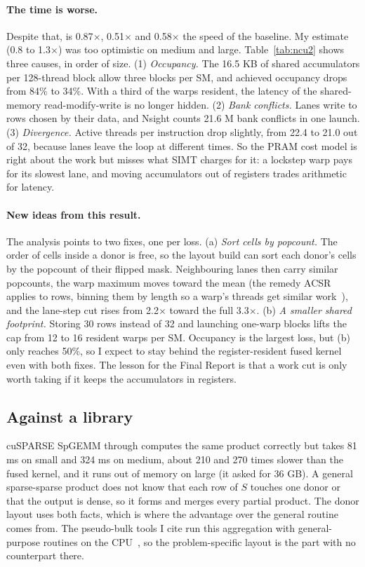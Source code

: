 \paragraph{The time is worse.} Despite that,  is 0.87$\times$, 0.51$\times$ and 0.58$\times$ the speed of the baseline. My estimate (0.8 to 1.3$\times$) was too optimistic on medium
and large. Table~\ref{tab:ncu2} shows three causes, in order of size.
(1) \emph{Occupancy.} The 16.5 KB of shared accumulators per 128-thread block allow three blocks per SM,
and achieved occupancy drops from 84\% to 34\%. With a third of the warps resident, the latency of the
shared-memory read-modify-write is no longer hidden. (2) \emph{Bank conflicts.} Lanes write to rows
chosen by their data, and Nsight counts 21.6 M bank conflicts in one launch. (3) \emph{Divergence.}
Active threads per instruction drop slightly, from 22.4 to 21.0 out of 32, because lanes leave the 
loop at different times. So the PRAM cost model is right about the work but misses what SIMT charges
for it: a lockstep warp pays for its slowest lane, and moving accumulators out of registers trades
arithmetic for latency.

\paragraph{New ideas from this result.} The analysis points to two fixes, one per loss. (a)
\emph{Sort cells by popcount.} The order of cells inside a donor is free, so the layout build can sort
each donor's cells by the popcount of their flipped mask. Neighbouring lanes then carry similar popcounts, the warp maximum moves toward the mean (the
remedy ACSR applies to rows, binning them by length so a warp's threads get similar
work~\cite{ashari2014}), and the lane-step cut rises from 2.2$\times$
toward the full 3.3$\times$. (b) \emph{A smaller shared footprint.} Storing 30 rows instead of 32 and
launching one-warp blocks lifts the cap from 12 to 16 resident warps per SM. Occupancy is the largest
loss, but (b) only reaches 50\%, so I expect  to stay behind the register-resident
fused kernel even with both fixes. The lesson for the Final Report is that a work cut is only worth
taking if it keeps the accumulators in registers.

\subsection{Against a library}

cuSPARSE SpGEMM through  computes the same product correctly but takes 81 ms on small and
324 ms on medium, about 210 and 270 times slower than the fused kernel, and it runs out of memory on large
(it asked for 36 GB). A general sparse-sparse product does not know that each row of $S$ touches one
donor or that the output is dense, so it forms and merges every partial product. The donor layout uses
both facts, which is where the advantage over the general routine comes from. The pseudo-bulk tools I cite run this aggregation with general-purpose
routines on the CPU~\cite{crowell2020,squair2021}, so the problem-specific layout is the part with no
counterpart there.

